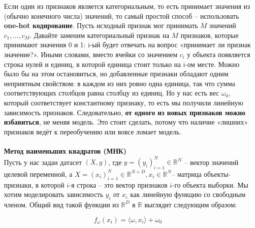 Если один из признаков является категориальным, то есть принимает значения из (обычно конечного числа) значений, то самый простой способ – использовать \textbf{one-hot кодирование}. Пусть исходный признак мог принимать $M$ значений $c_1,...,c_M$. Давайте заменим категориальный признак на $M$ признаков, которые принимают значения 0 и 1: i-ый будет отвечать на вопрос «принимает ли признак значение?». Иными словами, вместо ячейки со значением $c_i$ у объекта появляется строка нулей и единиц, в которой единица стоит только на i-ом месте. Можно было бы на этом остановиться, но добавленные признаки обладают одним неприятным свойством: в каждом из них ровно одна единица, так что сумма соответствующих столбцов равна столбцу из единиц. Но у нас есть вес $\omega_0$, который соответствует константному признаку, то есть мы получили линейную зависимость признаков. Следовательно, \textbf{от одного из новых признаков можно избавиться}, не меняя модель. Это стоит сделать, потому что наличие «лишних» признаков ведёт к переобучению или вовсе ломает модель.\\
\\
{\large \textbf{Метод наименьших квадратов (МНК)}} \\
Пусть у нас задан датасет $(X, y)$, где 
$y=(y_i)_{i=1}^N \in \mathbb{R}^{N}$ – вектор значений целевой переменной, а $X=(x_i)_{i=1}^N \in \mathbb{R}^{N+D}, x_i \in \mathbb{R}^{N}$– матрица объекты-признаки, в которой 
$i$-я строка – это вектор признаков 
$i$-го объекта выборки. Мы хотим моделировать зависимость $y_i$ от $x_i$ как линейную функцию со свободным членом. Общий вид такой функции из $\mathbb{R}^D$ в $\mathbb{R}$ выглядит следующим образом:

\begin{equation*}
    f_{\omega}(x_i)=\langle\omega,x_i\rangle+\omega_0
\end{equation*}

